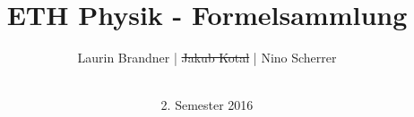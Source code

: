 \documentclass[a4paper, landscape]{article}
\begin{document}
\title{ETH Physik - Formelsammlung}
\date{2. Semester 2016}
\author{Laurin Brandner | \st{Jakub Kotal} | Nino Scherrer\\ \\}
\maketitle










\end{document}
